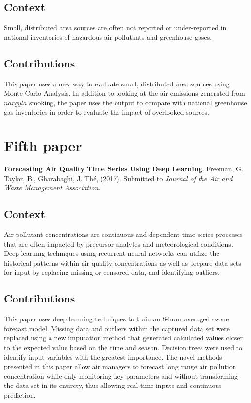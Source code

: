 \subsection{Context}
Small, distributed area sources are often not reported or under-reported in national inventories of hazardous air pollutants and greenhouse gases. 
\subsection{Contributions}
This paper uses a new way to evaluate small, distributed area sources using Monte Carlo Analysis. In addition to looking at the air emissions generated from $nargyla$ smoking, the paper uses the output to compare with national greenhouse gas inventories in order to evaluate the impact of overlooked sources.

\section{Fifth paper}

\textbf{Forecasting Air Quality Time Series Using Deep Learning}. Freeman, G. Taylor, B., Gharabaghi, J.  Th\'e, (2017). Submitted to \textit{Journal of the Air and Waste Management Association}.
\subsection{Context}
Air pollutant concentrations are continuous and dependent time series processes that are often impacted by precursor analytes and meteorological conditions. Deep learning techniques using recurrent neural networks can utilize the historical patterns within air quality concentrations as well as prepare data sets for input by replacing missing or censored data, and identifying outliers.

\subsection{Contributions}
This paper uses deep learning techniques to train an 8-hour averaged ozone forecast model. Missing data and outliers within the captured data set were replaced using a new imputation method that generated calculated values closer to the expected value based on the time and season. Decision trees were used to identify input variables with the greatest importance. The novel methods presented in this paper allow air managers to forecast long range air pollution concentration while only monitoring key parameters and without transforming the data set in its entirety, thus allowing real time inputs and continuous prediction.

\clearpage
